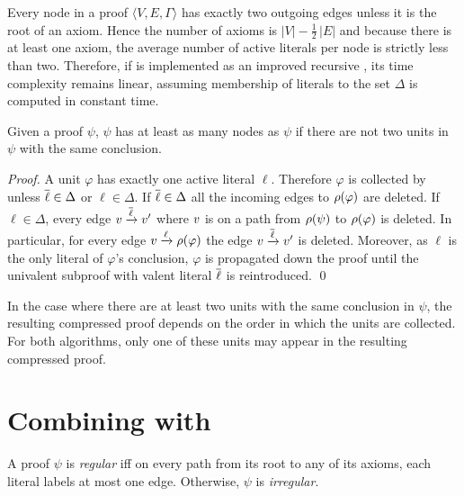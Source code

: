 \documentclass{llncs}
\begin{document}
Every node in a proof $\langle V, E, \Gamma \rangle$ has exactly two outgoing edges unless it is the
root of an axiom. Hence the number of axioms is $|V| - \frac{1}{2}\,|E|$ and because there is at
least one axiom, the average number of active literals per node is strictly less than two.
Therefore, if {\LowerUnivalents} is implemented as an improved recursive , its time
complexity remains linear, assuming membership of literals to the set $\Delta$ is computed in constant
time.

\begin{proposition} \label{prop:compression}
Given a proof $\psi$,
{\LowerUnits\FuncSty{(}$\psi$\FuncSty{)}}
has at least as many nodes as 
{\LowerUnivalents\FuncSty{(}$\psi$\FuncSty{)}}
if there are not two units in $\psi$ with the same conclusion.
\end{proposition}

\begin{proof}
A unit $\varphi$ has exactly one active literal $\ell$. Therefore $\varphi$ is collected by
{\LowerUnivalents} unless $\overline{\ell} \in \Delta$ or $\ell \in \Delta$. If $\overline{\ell} \in \Delta$
all the incoming edges to $\rho(\varphi)$ are deleted. If $\ell \in \Delta$, every edge
$v \xrightarrow{\overline{\ell}} v'$ where $v$ is on a path from $\rho(\psi)$ to $\rho(\varphi)$
is deleted.
In particular, for every edge $v \xrightarrow{\ell} \rho(\varphi)$ the edge $v
\xrightarrow{\overline{\ell}} v'$ is deleted.  Moreover, as $\ell$ is the only literal of $\varphi$'s
conclusion, $\varphi$ is propagated down the proof until the univalent subproof with valent literal
$\overline{\ell}$ is reintroduced. \qed
\end{proof}

In the case where there are at least two units with the same conclusion in $\psi$, the resulting
compressed proof depends on the order in which the units are collected. For both algorithms, only one of these
units may appear in the resulting compressed proof.



\section{Combining {\LowerUnivalents} with {\RPI}} \label{sec:LUnivRPI}

\begin{definition}
A proof $\psi$ is \emph{regular} iff on every path from its root to any of its axioms, each literal
labels at most one edge. Otherwise, $\psi$ is \emph{irregular}.
\end{definition}
\end{document}
